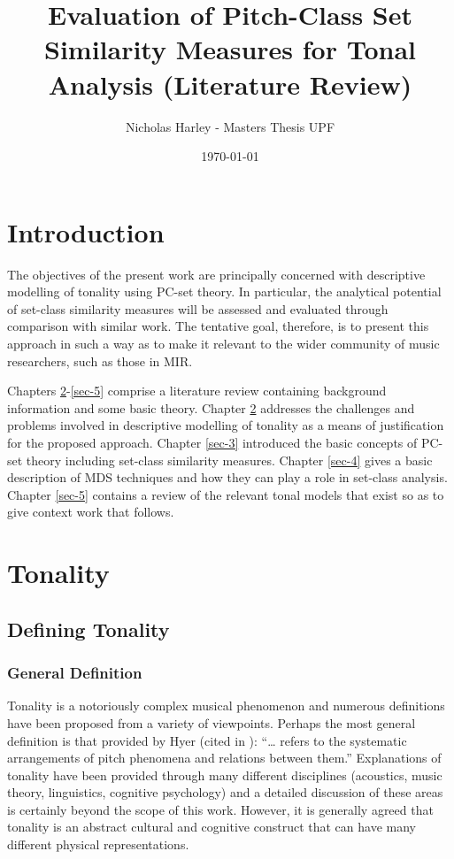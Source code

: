 \documentclass{article}
\title{Evaluation of Pitch-Class Set Similarity Measures for Tonal Analysis (Literature Review)}
\author{Nicholas Harley - Masters Thesis UPF}
\date{\today}
\begin{document}
\maketitle

\setcounter{tocdepth}{3}
\tableofcontents
\vspace*{1cm}

\section{Introduction}
\label{sec-1}

The objectives of the present work are principally concerned with
descriptive modelling of tonality using PC-set theory. In particular,
the analytical potential of set-class similarity measures will be
assessed and evaluated through comparison with similar work. The
tentative goal, therefore, is to present this approach in such a way
as to make it relevant to the wider community of music researchers,
such as those in MIR.

Chapters \ref{sec-2}-\ref{sec-5} comprise a literature
review containing background information and some basic
theory. Chapter \ref{sec-2} addresses the challenges and problems
involved in descriptive modelling of tonality as a means of
justification for the proposed approach. Chapter \ref{sec-3} introduced the basic concepts of PC-set theory including
set-class similarity measures. Chapter \ref{sec-4}
gives a basic description of MDS techniques and how they can play a
role in set-class analysis. Chapter \ref{sec-5}
contains a review of the relevant tonal models that exist so as to
give context work that follows.
\section{Tonality}
\label{sec-2}
\subsection{Defining Tonality}
\label{sec-2-1}
\subsubsection{General Definition}
\label{sec-2-1-1}

Tonality is a notoriously complex musical phenomenon and numerous
definitions have been proposed from a variety of viewpoints. Perhaps
the most general definition is that provided by Hyer (cited in
\citealt[pp. 6]{Martorell2013}): ``\ldots{} refers to the systematic
arrangements of pitch phenomena and relations between
them.'' Explanations of tonality have been provided through many
different disciplines (acoustics, music theory, linguistics, cognitive
psychology) and a detailed discussion of these areas is certainly
beyond the scope of this work. However, it is generally agreed that
tonality is an abstract cultural and cognitive construct that can have
many different physical representations.
\end{document}
